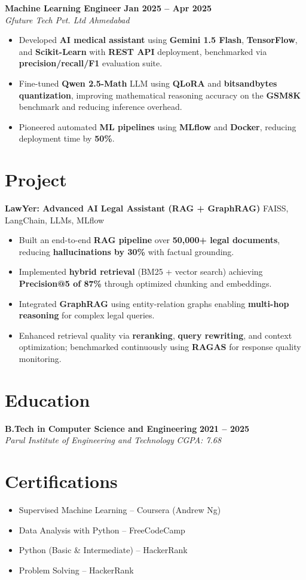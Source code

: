 \documentclass[letterpaper,9pt]{extarticle}
\newcommand{\role}[4]{\textbf{#1} \hfill \textbf{#2}\\[-1pt]\textit{#3} \hfill \textit{#4}\vspace{1pt}}
\begin{document}
\role{Machine Learning Engineer}{Jan 2025 -- Apr 2025}{Gfuture Tech Pvt. Ltd}{Ahmedabad}
\begin{itemize}
  \item Developed \textbf{AI medical assistant} using \textbf{Gemini 1.5 Flash}, \textbf{TensorFlow}, and \textbf{Scikit-Learn} with \textbf{REST API} deployment, benchmarked via \textbf{precision/recall/F1} evaluation suite.
  \item Fine-tuned \textbf{Qwen 2.5-Math} LLM using \textbf{QLoRA} and \textbf{bitsandbytes quantization}, improving mathematical reasoning accuracy on the \textbf{GSM8K} benchmark and reducing inference overhead.
  \item Pioneered automated \textbf{ML pipelines} using \textbf{MLflow} and \textbf{Docker}, reducing deployment time by \textbf{50\%}.
\end{itemize}

\section{Project}
\textbf{LawYer: Advanced AI Legal Assistant (RAG + GraphRAG)} \textbar{} FAISS, LangChain, LLMs, MLflow
\begin{itemize}
  \item Built an end-to-end \textbf{RAG pipeline} over \textbf{50,000+ legal documents}, reducing \textbf{hallucinations by 30\%} with factual grounding.
  \item Implemented \textbf{hybrid retrieval} (BM25 + vector search) achieving \textbf{Precision@5 of 87\%} through optimized chunking and embeddings.
  \item Integrated \textbf{GraphRAG} using entity-relation graphs enabling \textbf{multi-hop reasoning} for complex legal queries.
  \item Enhanced retrieval quality via \textbf{reranking}, \textbf{query rewriting}, and context optimization; benchmarked continuously using \textbf{RAGAS} for response quality monitoring.
\end{itemize}

\section{Education}
\textbf{B.Tech in Computer Science and Engineering} \hfill \textbf{2021 -- 2025}\\[-1pt]
\textit{Parul Institute of Engineering and Technology} \hfill \textit{CGPA: 7.68}

\section{Certifications}
\begin{itemize}
  \item Supervised Machine Learning -- Coursera (Andrew Ng)
  \item Data Analysis with Python -- FreeCodeCamp
  \item Python (Basic \& Intermediate) -- HackerRank
  \item Problem Solving -- HackerRank
\end{itemize}
\end{document}
